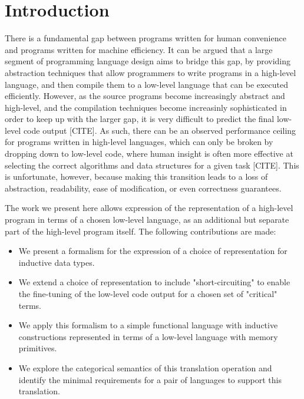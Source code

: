 \section{Introduction}\label{sec:intro}

There is a fundamental gap between programs written for human convenience and
programs written for machine efficiency. It can be argued that a large segment
of programming language design aims to bridge this gap, by providing
abstraction techniques that allow programmers to write programs in a high-level
language, and then compile them to a low-level language that can be executed
efficiently. However, as the source programs become increasingly abstract and
high-level, and the compilation techniques become increasinly sophisticated in
order to keep up with the larger gap, it is very difficult to predict the final
low-level code output [CITE]. As such, there can be an observed performance
ceiling for programs written in high-level languages, which can only be broken
by dropping down to low-level code, where human insight is often more effective
at selecting the correct algorithms and data structures for a given task
  [CITE]. This is unfortunate, however, because making this transition leads to a
loss of abstraction, readability, ease of modification, or even correctness
guarantees.

The work we present here allows expression of the representation of a
high-level program in terms of a chosen low-level language, as an additional
but separate part of the high-level program itself. The following contributions
are made:
\begin{itemize}
  \item We present a formalism for the expression of a choice of representation for
        inductive data types.
  \item We extend a choice of representation to include "short-circuiting" to enable
        the fine-tuning of the low-level code output for a chosen set of "critical"
        terms.
  \item We apply this formalism to a simple functional language with inductive
        constructions represented in terms of a low-level language with memory
        primitives.
  \item We explore the categorical semantics of this translation operation and identify
        the minimal requirements for a pair of languages to support this translation.
\end{itemize}


